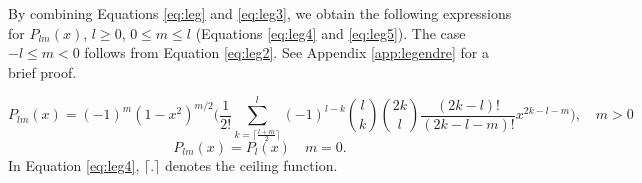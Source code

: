 \documentclass[12pt]{article}
\begin{document}
By combining Equations \ref{eq:leg} and \ref{eq:leg3}, we obtain the following expressions for $P_{lm}(x)$, $l \ge 0$, $0 \le m \le l$ (Equations \ref{eq:leg4} and \ref{eq:leg5}). The case $-l \le m <0$ follows from Equation \ref{eq:leg2}. See Appendix \ref{app:legendre} for a brief proof.

\begin{equation}
    \label{eq:leg4}
    P_{lm}(x) = (-1)^m (1-x^2)^{m/2} \Bigg( \frac{1}{2!} \sum_{k=\lceil \frac{l+m}{2} \rceil}^l  (-1)^{l-k} {l \choose k} {2k \choose l} \frac{(2k-l)!}{(2k-l-m)!} x^{2k-l-m} \Bigg), \quad m >0
\end{equation}
\begin{equation}
    \label{eq:leg5}
    P_{lm}(x) = P_l(x)  \quad m = 0.
\end{equation} 
In Equation \ref{eq:leg4}, $\lceil . \rceil$ denotes the ceiling function.


\end{document}

